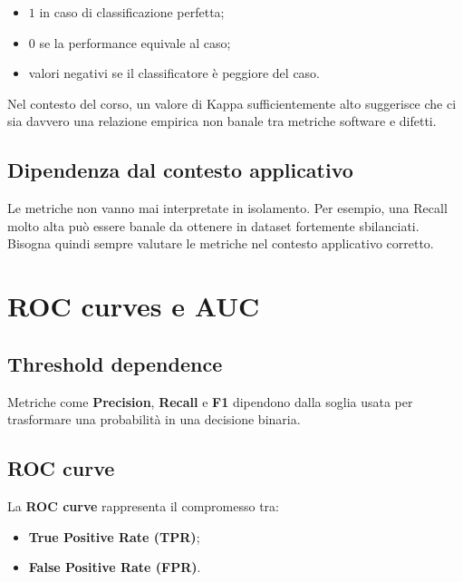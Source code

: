 \begin{itemize}
    \item \(1\) in caso di classificazione perfetta;
    \item \(0\) se la performance equivale al caso;
    \item valori negativi se il classificatore è peggiore del caso.
\end{itemize}

\begin{notaprof}
Nel contesto del corso, un valore di Kappa sufficientemente alto suggerisce che ci sia davvero una relazione empirica non banale tra metriche software e difetti.
\end{notaprof}

\subsection{Dipendenza dal contesto applicativo}

\begin{notaslide}
Le metriche non vanno mai interpretate in isolamento. Per esempio, una Recall molto alta può essere banale da ottenere in dataset fortemente sbilanciati. Bisogna quindi sempre valutare le metriche nel contesto applicativo corretto.
\end{notaslide}

\section{ROC curves e AUC}

\subsection{Threshold dependence}

Metriche come \textbf{Precision}, \textbf{Recall} e \textbf{F1} dipendono dalla soglia usata per trasformare una probabilità in una decisione binaria.

\subsection{ROC curve}

La \textbf{ROC curve} rappresenta il compromesso tra:

\begin{itemize}
    \item \textbf{True Positive Rate (TPR)};
    \item \textbf{False Positive Rate (FPR)}.
\end{itemize}

